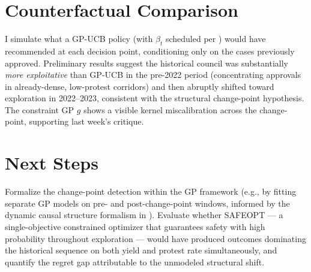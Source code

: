\documentclass[11pt,twoside]{article}
\begin{document}
\section*{Counterfactual Comparison}
I simulate what a GP-UCB policy (with $\beta_t$ scheduled per \citet{srinivas2010ucb}) would have recommended at each decision point, conditioning only on the cases previously approved. Preliminary results suggest the historical council was substantially \textit{more exploitative} than GP-UCB in the pre-2022 period (concentrating approvals in already-dense, low-protest corridors) and then abruptly shifted toward exploration in 2022--2023, consistent with the structural change-point hypothesis. The constraint GP $g$ shows a visible kernel miscalibration across the change-point, supporting last week's critique.

\section*{Next Steps}
Formalize the change-point detection within the GP framework (e.g., by fitting separate GP models on pre- and post-change-point windows, informed by the dynamic causal structure formalism in \citet{aglietti2021dcbo}). Evaluate whether SAFEOPT \citep{sui2015safeopt} --- a single-objective constrained optimizer that guarantees safety with high probability throughout exploration --- would have produced outcomes dominating the historical sequence on both yield and protest rate simultaneously, and quantify the regret gap attributable to the unmodeled structural shift.

\vspace{-0.5em}
{\scriptsize
\setlength{\bibsep}{0pt}


}
\end{document}
